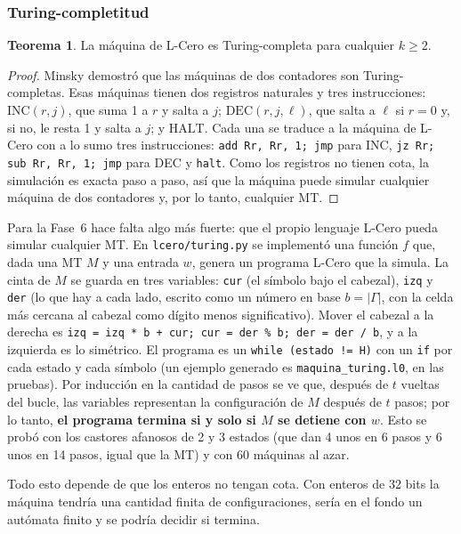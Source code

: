 \documentclass[11pt,a4paper]{article}
\theoremstyle{definition}
\newtheorem{teorema}{Teorema}
\newcommand{\tm}[1]{\texttt{#1}}
\renewcommand{\paragraph}[1]{\subsubsection*{#1}}
\begin{document}
\paragraph{Turing-completitud}

\begin{teorema}
La máquina de L-Cero es Turing-completa para cualquier $k \ge 2$.
\end{teorema}

\begin{proof}
Minsky demostró que las máquinas de dos contadores son Turing-completas.
Esas máquinas tienen dos registros naturales y tres instrucciones:
$\mathrm{INC}(r, j)$, que suma 1 a $r$ y salta a $j$;
$\mathrm{DEC}(r, j, \ell)$, que salta a $\ell$ si $r = 0$ y, si no, le resta
1 y salta a $j$; y $\mathrm{HALT}$. Cada una se traduce a la máquina de
L-Cero con a lo sumo tres instrucciones: \tm{add Rr, Rr, 1; jmp} para INC,
\tm{jz Rr; sub Rr, Rr, 1; jmp} para DEC y \tm{halt}. Como los registros no
tienen cota, la simulación es exacta paso a paso, así que la máquina puede
simular cualquier máquina de dos contadores y, por lo tanto, cualquier MT.
\end{proof}

Para la Fase~6 hace falta algo más fuerte: que el propio lenguaje L-Cero
pueda simular cualquier MT. En \tm{lcero/turing.py} se implementó una
función $f$ que, dada una MT $M$ y una entrada $w$, genera un programa
L-Cero que la simula. La cinta de $M$ se guarda en tres variables: \tm{cur}
(el símbolo bajo el cabezal), \tm{izq} y \tm{der} (lo que hay a cada lado,
escrito como un número en base $b = |\Gamma|$, con la celda más cercana al
cabezal como dígito menos significativo). Mover el cabezal a la derecha es
\tm{izq = izq * b + cur; cur = der \% b; der = der / b}, y a la izquierda es
lo simétrico. El programa es un \tm{while (estado != H)} con un \tm{if} por
cada estado y cada símbolo (un ejemplo generado es \tm{maquina\_turing.l0},
en las pruebas). Por inducción en la cantidad de pasos se ve que, después
de $t$ vueltas del bucle, las variables representan la configuración de $M$
después de $t$ pasos; por lo tanto, \textbf{el programa termina si y solo si
$M$ se detiene con $w$}. Esto se probó con los castores afanosos de 2 y 3
estados (que dan 4 unos en 6 pasos y 6 unos en 14 pasos, igual que la MT) y
con 60 máquinas al azar.

Todo esto depende de que los enteros no tengan cota. Con enteros de 32 bits
la máquina tendría una cantidad finita de configuraciones, sería en el fondo
un autómata finito y se podría decidir si termina.
\end{document}
